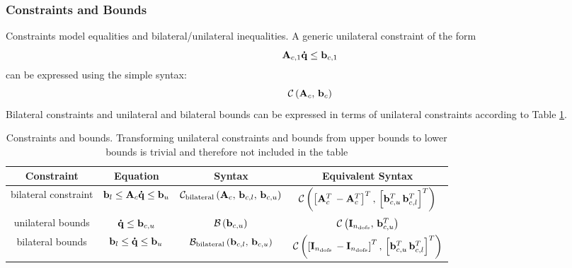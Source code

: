 \subsubsection{Constraints and Bounds}
Constraints model equalities and bilateral/unilateral inequalities. 
A generic unilateral constraint of the form
\begin{equation}
\mathbf{A}_{c,1}\mathbf{\dot{q}} \leq \mathbf{b}_{c,1} 
\end{equation}
can be expressed using the simple syntax: 
\begin{equation}
\mathcal{C}\left( \mathbf{A}_c,\, \mathbf{b}_c \right)
\end{equation}
Bilateral constraints and unilateral and bilateral bounds can be expressed in terms of unilateral constraints according to Table \ref{table:constraints_and_bounds}.

\begin{table}[hbt]
   \begin{center}
   \begin{tabular}{| c | c | c | c |}
   \hline
   Constraint & Equation & Syntax & Equivalent Syntax \\\hline
   \cline{1-4}
   bilateral constraint & $\mathbf{b}_{l} \leq \mathbf{A}_{c}\mathbf{\dot{q}} \leq \mathbf{b}_{u}$ & $\mathcal{C}_\text{bilateral}\left( \mathbf{A}_c, \, \mathbf{b}_{c,l}, \, \mathbf{b}_{c,u} \right)$ & $\mathcal{C} \left( \left[ \mathbf{A}_{c}^T \, -\mathbf{A}_{c}^T \right]^T, \, \left[ \mathbf{b}_{c,u}^T \, \mathbf{b}_{c,l}^T \right]^T \right)$ \\\hline
   unilateral bounds     & $\mathbf{\dot{q}} \leq \mathbf{b}_{c,u}$       & $\mathcal{B}\left( \mathbf{b}_{c,u} \right)$ & $\mathcal{C}\left(\mathbf{I}_{n_\text{dofs}}, \, \mathbf{b}_{c,u}^T \right)$ \\\hline
   bilateral bounds     & $\mathbf{b}_{l} \leq \mathbf{\dot{q}} \leq \mathbf{b}_{u}$       & $\mathcal{B}_\text{bilateral}\left( \mathbf{b}_{c,l}, \, \mathbf{b}_{c,u} \right)$ & $\mathcal{C}\left(\left[ \mathbf{I}_{n_\text{dofs}}  \, -\mathbf{I}_{n_\text{dofs}} \right]^T, \, \left[ \mathbf{b}_{c,u}^T \, \mathbf{b}_{c,l}^T \right]^T \right)$ \\\hline
   \end{tabular}
   \end{center}
   \caption{Constraints and bounds. Transforming unilateral constraints and bounds from upper bounds to lower bounds is trivial and therefore not included in the table}
   \label{table:constraints_and_bounds}
\end{table}

